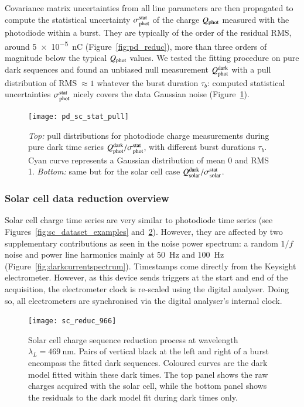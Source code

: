Covariance matrix uncertainties from all line parameters are then propagated to compute the statistical uncertainty $\sigma_{\mathrm{phot}}^{\mathrm{stat}}$ of the charge $Q_{\mathrm{phot}}$ measured with the photodiode within a burst. They are typically of the order of the residual RMS, around \SI{5e-5}{\nano\coulomb} (Figure~\ref{fig:pd_reduc}), more than three orders of magnitude below the typical $Q_{\mathrm{phot}}$ values. We tested the fitting procedure on pure dark sequences and found an unbiased null measurement $Q_{\mathrm{phot}}^{\rm dark}$ with a pull distribution of RMS$\;\approx 1$ whatever the burst duration $\tau_b$: computed statistical uncertainties $\sigma_{\mathrm{phot}}^{\mathrm{stat}}$ nicely covers the data Gaussian noise (Figure~\ref{fig:charge_pull}).

\begin{figure}[!h]
\centering
\texttt{[image: pd\_sc\_stat\_pull]}
\caption{\textit{Top:} pull distributions for photodiode charge measurements during pure dark time series $Q_{\mathrm{phot}}^{\rm dark} / \sigma_{\mathrm{phot}}^{\mathrm{stat}}$, with different burst durations $\tau_b$. Cyan curve represents a Gaussian distribution of mean 0 and RMS 1. \textit{Bottom:} same but for the solar cell case $Q_{\mathrm{solar}}^{\rm dark} / \sigma_{\mathrm{solar}}^{\mathrm{stat}}$.}\label{fig:charge_pull}
\end{figure}



\subsubsection{Solar cell data reduction overview}
\label{sec:solar_reduction}

Solar cell charge time series are very similar to photodiode time series (see Figures~\ref{fig:sc_dataset_examples} and~\ref{fig:sc_reduc}). However, they are affected by two supplementary contributions as seen in the noise power spectrum: a random $1/f$ noise and power line harmonics mainly at \SI{50}{\hertz} and \SI{100}{\hertz} (Figure~\ref{fig:darkcurrentspectrum}). Timestamps come directly from the Keysight electrometer. However, as this device sends triggers at the start and end of the acquisition, the electrometer clock is re-scaled using the digital analyser. Doing so, all electrometers are synchronised via the digital analyser's internal clock.


\begin{figure}[!h]
\centering
\texttt{[image: sc\_reduc\_966]}
\caption{Solar cell charge sequence reduction process at wavelength $\lambda_L=\SI{469}{\nm}$. Pairs of vertical black at the left and right of a burst encompass the fitted dark sequences. Coloured curves are the dark model fitted within these dark times. The top panel shows the raw charges acquired with the solar cell, while the bottom panel shows the residuals to the dark model fit during dark times only.}\label{fig:sc_reduc}
\end{figure}

